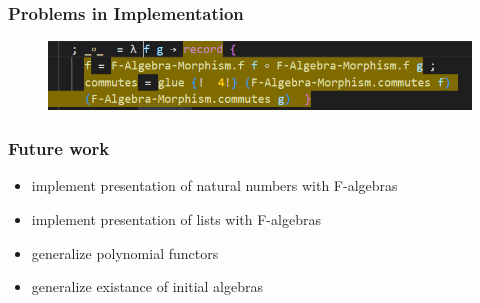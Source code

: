 \documentclass{beamer}
\begin{document}
\begin{frame}
\frametitle{Problems in Implementation}

\pause

\begin{figure}[h]
\includegraphics[width=12cm]{yellow.PNG}
\end{figure}


\end{frame}
\begin{frame}
\frametitle{Future work}
\begin{itemize}
\item implement presentation of natural numbers with F-algebras
\item implement presentation of lists with F-algebras
\item generalize polynomial functors
\item generalize existance of initial algebras
\end{itemize}


\end{frame}




\end{document}
